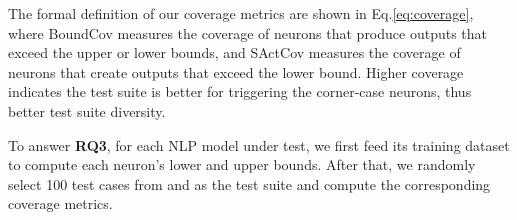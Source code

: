 \noindent The formal definition of our coverage metrics are shown in Eq.\ref{eq:coverage}, where BoundCov measures the coverage of neurons that produce outputs that exceed the upper or lower bounds, and SActCov measures the coverage of neurons that create outputs that exceed the lower bound.
Higher coverage indicates the test suite is better for triggering the corner-case neurons, thus better test suite diversity.





To answer {\bf RQ3}, for each NLP model under test, we first feed its training dataset to compute each neuron's lower and upper bounds. After that, we randomly select 100  test cases from \tool and \Cklst as the test suite and compute the corresponding coverage metrics. 

%
%

